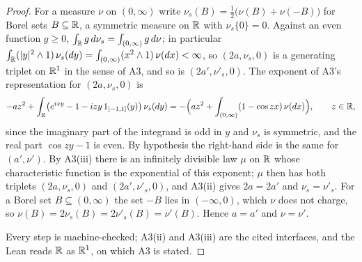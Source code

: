 \begin{proof}
\leanok
For a measure $\nu$ on $(0,\infty)$ write $\nu_s(B) = \tfrac12\bigl(\nu(B) + \nu(-B)\bigr)$ for
Borel sets $B \subseteq \mathbb{R}$, a symmetric measure on $\mathbb{R}$ with $\nu_s\{0\} = 0$. Against an even
function $g \ge 0$, $\int_{\mathbb{R}} g\,d\nu_s = \int_{(0,\infty)} g\,d\nu$; in particular
$\int_{\mathbb{R}}(|y|^2 \wedge 1)\,\nu_s(dy) = \int_{(0,\infty)}(x^2 \wedge 1)\,\nu(dx) < \infty$, so
$(2a, \nu_s, 0)$ is a generating triplet on $\mathbb{R}^1$ in the sense of A3, and so is
$(2a', \nu'_s, 0)$. The exponent of A3's representation for $(2a, \nu_s, 0)$ is
\[
  -a z^2 + \int_{\mathbb{R}}\bigl(e^{izy} - 1 - izy\,1_{[-1,1]}(y)\bigr)\,\nu_s(dy)
  = -\Bigl(a z^2 + \int_{(0,\infty)}(1 - \cos zx)\,\nu(dx)\Bigr), \qquad z \in \mathbb{R} ,
\]
since the imaginary part of the integrand is odd in $y$ and $\nu_s$ is symmetric, and the real
part $\cos zy - 1$ is even. By hypothesis the right-hand side is the same for $(a', \nu')$. By
A3(iii) there is an infinitely divisible law $\mu$ on $\mathbb{R}$ whose characteristic function is the
exponential of this exponent; $\mu$ then has both triplets $(2a, \nu_s, 0)$ and
$(2a', \nu'_s, 0)$, and A3(ii) gives $2a = 2a'$ and $\nu_s = \nu'_s$. For a Borel set
$B \subseteq (0,\infty)$ the set $-B$ lies in $(-\infty, 0)$, which $\nu$ does not charge, so
$\nu(B) = 2\nu_s(B) = 2\nu'_s(B) = \nu'(B)$. Hence $a = a'$ and $\nu = \nu'$.

Every step is machine-checked; A3(ii) and A3(iii) are the cited interfaces, and the Lean reads
$\mathbb{R}$ as $\mathbb{R}^1$, on which A3 is stated.
\end{proof}

